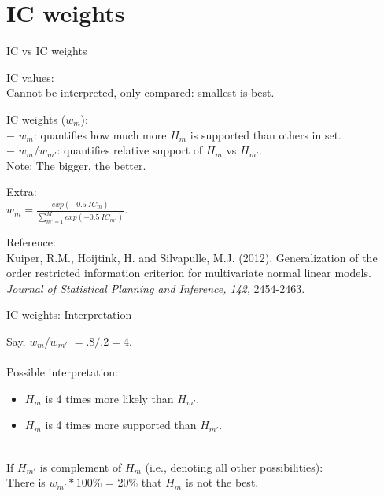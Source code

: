 \documentclass[10pt]{beamer}\usepackage[]{graphicx}\usepackage[]{xcolor}
\begin{document}
\section{IC weights}
%
%
\begin{frame}[fragile]{IC vs IC weights}
	
	IC values:\\ 
	Cannot be interpreted, only compared: smallest is best.
	
	\vspace{\baselineskip}
	
	IC weights ($\mathit{w_{m}}$): \\
	$-$ $\mathit{w_{m}}$: quantifies how much more $H_m$ is supported than others in set.\\ 
	$-$ $\mathit{w_{m}}$/$\mathit{w_{m'}}$: quantifies relative support of $H_m$ vs $H_{m'}$.\\
	Note: The bigger, the better.
	
	\vspace{\baselineskip}
	
	Extra:\\
		$\mathit{w_{m}} = \frac{exp(-0.5~IC_m)}{\sum_{m'=1}^{M}exp(-0.5~IC_{m'})}$.
	
	\vspace{\baselineskip}
	
	\footnotesize{
		Reference:\\
		Kuiper, R.M., Hoijtink, H. and Silvapulle, M.J. (2012). Generalization of the order restricted information criterion for multivariate normal linear models. \emph{Journal of Statistical Planning and Inference, 142}, 2454-2463.
	}
\end{frame}
%
\begin{frame}[fragile]{IC weights: Interpretation}
	
	Say, $\mathit{w_{m}}$/$\mathit{w_{m'}}$ $= .8 / .2 = 4$.\\
	~\\
	Possible interpretation:
	\begin{itemize}
	  \item $H_m$ is 4 times more likely than $H_{m'}$. 
	  \item $H_m$ is 4 times more supported than $H_{m'}$.
	\end{itemize}
	
	~\\
	
	If $H_{m'}$ is complement of $H_m$ (i.e., denoting all other possibilities):\\
	There is $\mathit{w_{m'}}*100$\% = 20\% that $H_m$ is not the best.
	
\end{frame}
\end{document}
